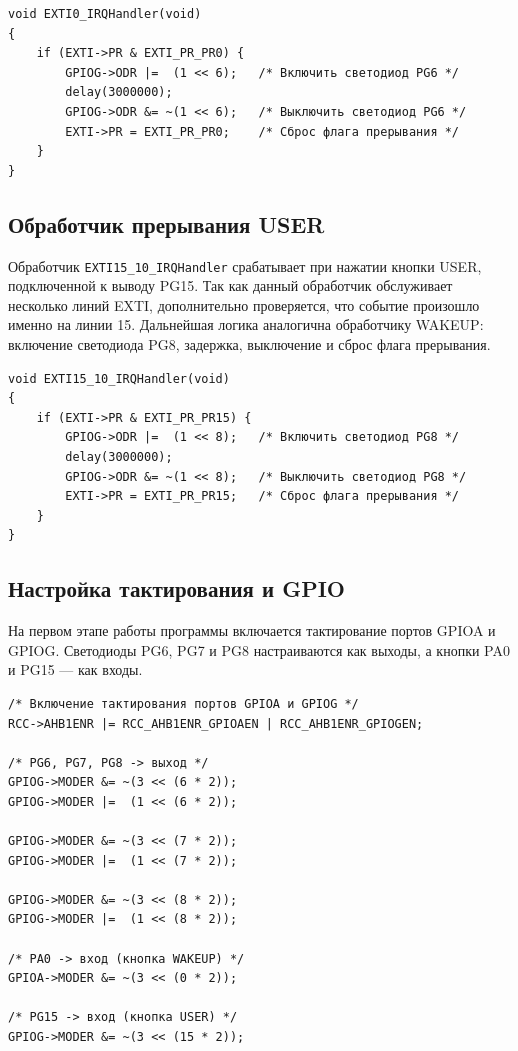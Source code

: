 \begin{listing}[H]
\caption{Обработчик прерывания WAKEUP}
\begin{verbatim}
void EXTI0_IRQHandler(void)
{
    if (EXTI->PR & EXTI_PR_PR0) {
        GPIOG->ODR |=  (1 << 6);   /* Включить светодиод PG6 */
        delay(3000000);
        GPIOG->ODR &= ~(1 << 6);   /* Выключить светодиод PG6 */
        EXTI->PR = EXTI_PR_PR0;    /* Сброс флага прерывания */
    }
}
\end{verbatim}
\end{listing}

\subsection{Обработчик прерывания USER}

Обработчик \verb|EXTI15_10_IRQHandler| срабатывает при нажатии кнопки USER, подключенной к выводу PG15.
Так как данный обработчик обслуживает несколько линий EXTI, дополнительно проверяется, что событие произошло именно на линии 15.
Дальнейшая логика аналогична обработчику WAKEUP: включение светодиода PG8, задержка, выключение и сброс флага прерывания.

\begin{listing}[H]
\caption{Обработчик прерывания USER}
\begin{verbatim}
void EXTI15_10_IRQHandler(void)
{
    if (EXTI->PR & EXTI_PR_PR15) {
        GPIOG->ODR |=  (1 << 8);   /* Включить светодиод PG8 */
        delay(3000000);
        GPIOG->ODR &= ~(1 << 8);   /* Выключить светодиод PG8 */
        EXTI->PR = EXTI_PR_PR15;   /* Сброс флага прерывания */
    }
}
\end{verbatim}
\end{listing}

\subsection{Настройка тактирования и GPIO}

На первом этапе работы программы включается тактирование портов GPIOA и GPIOG.
Светодиоды PG6, PG7 и PG8 настраиваются как выходы, а кнопки PA0 и PG15 --- как входы.

\begin{listing}[H]
\caption{Настройка тактирования и GPIO}
\begin{verbatim}
/* Включение тактирования портов GPIOA и GPIOG */
RCC->AHB1ENR |= RCC_AHB1ENR_GPIOAEN | RCC_AHB1ENR_GPIOGEN;

/* PG6, PG7, PG8 -> выход */
GPIOG->MODER &= ~(3 << (6 * 2));
GPIOG->MODER |=  (1 << (6 * 2));

GPIOG->MODER &= ~(3 << (7 * 2));
GPIOG->MODER |=  (1 << (7 * 2));

GPIOG->MODER &= ~(3 << (8 * 2));
GPIOG->MODER |=  (1 << (8 * 2));

/* PA0 -> вход (кнопка WAKEUP) */
GPIOA->MODER &= ~(3 << (0 * 2));

/* PG15 -> вход (кнопка USER) */
GPIOG->MODER &= ~(3 << (15 * 2));
\end{verbatim}
\end{listing}

